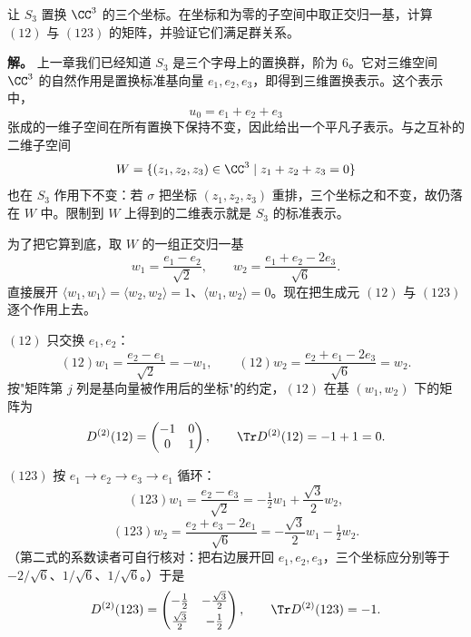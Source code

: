\begin{example}[$S_3$ 的二维标准表示]
让 $S_3$ 置换 $\CC^3$ 的三个坐标。在坐标和为零的子空间中取正交归一基，计算 $(12)$ 与 $(123)$ 的矩阵，并验证它们满足群关系。

\textbf{解。} 上一章我们已经知道 $S_3$ 是三个字母上的置换群，阶为 $6$。它对三维空间 $\CC^3$ 的自然作用是置换标准基向量 $e_1,e_2,e_3$，即得到三维置换表示。这个表示中，
\[
u_0=e_1+e_2+e_3
\]
张成的一维子空间在所有置换下保持不变，因此给出一个平凡子表示。与之互补的二维子空间
\[
W=\{(z_1,z_2,z_3)\in\CC^3\mid z_1+z_2+z_3=0\}
\]
也在 $S_3$ 作用下不变：若 $\sigma$ 把坐标 $(z_1,z_2,z_3)$ 重排，三个坐标之和不变，故仍落在 $W$ 中。限制到 $W$ 上得到的二维表示就是 $S_3$ 的标准表示。

为了把它算到底，取 $W$ 的一组正交归一基
\[
w_1=\frac{e_1-e_2}{\sqrt2},\qquad
w_2=\frac{e_1+e_2-2e_3}{\sqrt6}.
\]
直接展开 $\langle w_1,w_1\rangle=\langle w_2,w_2\rangle=1$、$\langle w_1,w_2\rangle=0$。现在把生成元 $(12)$ 与 $(123)$ 逐个作用上去。

$(12)$ 只交换 $e_1,e_2$：
\[
(12)w_1=\frac{e_2-e_1}{\sqrt2}=-w_1,\qquad
(12)w_2=\frac{e_2+e_1-2e_3}{\sqrt6}=w_2.
\]
按"矩阵第 $j$ 列是基向量被作用后的坐标"的约定，$(12)$ 在基 $(w_1,w_2)$ 下的矩阵为
\[
D^{(2)}(12)=
\begin{pmatrix}-1&0\\ 0&1\end{pmatrix},
\qquad \Tr D^{(2)}(12)=-1+1=0.
\]

$(123)$ 按 $e_1\to e_2\to e_3\to e_1$ 循环：
\[
(123)w_1=\frac{e_2-e_3}{\sqrt2}=-\tfrac12 w_1+\frac{\sqrt3}{2}w_2,
\]
\[
(123)w_2=\frac{e_2+e_3-2e_1}{\sqrt6}=-\frac{\sqrt3}{2}w_1-\tfrac12 w_2.
\]
（第二式的系数读者可自行核对：把右边展开回 $e_1,e_2,e_3$，三个坐标应分别等于 $-2/\sqrt6$、$1/\sqrt6$、$1/\sqrt6$。）于是
\[
D^{(2)}(123)=
\begin{pmatrix}-\tfrac12&-\tfrac{\sqrt3}{2}\\[2pt] \tfrac{\sqrt3}{2}&-\tfrac12\end{pmatrix},
\qquad
\Tr D^{(2)}(123)=-1.
\]


\end{example}
